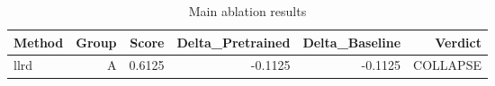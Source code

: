 \begin{table}[htbp]
\centering
\caption{Main ablation results}
\label{tab:main-results}
\begin{tabular}{lrrrrr}
\toprule
\textbf{Method} & \textbf{Group} & \textbf{Score} & \textbf{Delta\_Pretrained} & \textbf{Delta\_Baseline} & \textbf{Verdict} \\
\midrule
llrd & A & 0.6125 & -0.1125 & -0.1125 & COLLAPSE \\
\bottomrule
\end{tabular}
\end{table}